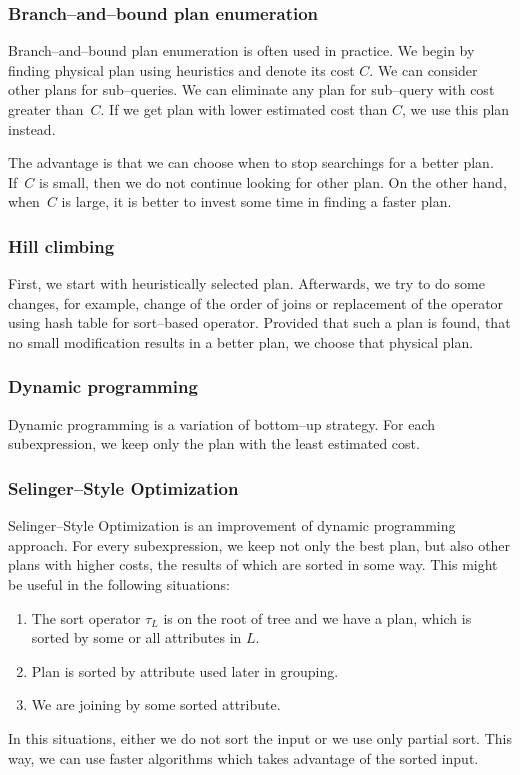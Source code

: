 \subsubsection{Branch--and--bound plan enumeration}
Branch--and--bound plan enumeration is often used in practice. We begin by finding physical plan using heuristics and denote its cost $C$. We can consider other plans for sub--queries. We can eliminate any plan for sub--query with cost greater than~$C$. If we get plan with lower estimated cost than $C$, we use this plan instead.

The advantage is that we can choose when to stop searchings for a better plan. If~$C$ is small, then we do not continue looking for other plan. On the other hand, when~$C$ is large, it is better to invest some time in finding a faster plan.
\subsubsection{Hill climbing}

First, we start with heuristically selected plan. Afterwards, we try to do some changes, for example, change of the order of joins or replacement of the operator using hash table for sort--based operator. Provided that such a plan is found, that no small modification results in a better plan, we choose that physical plan.

\subsubsection{Dynamic programming}
Dynamic programming is a variation of bottom--up strategy. For each subexpression, we keep only the plan with the least estimated cost.

\subsubsection{Selinger--Style Optimization}
Selinger--Style Optimization is an improvement of dynamic programming approach. For every subexpression, we keep not only the best plan, but also other plans with higher costs, the results of which are sorted in some way. This might be useful in the following situations:
\begin{enumerate}
\item The sort operator $\tau_L$ is on the root of tree and we have a plan, which is sorted by some or all attributes in $L$.
\item Plan is sorted by attribute used later in grouping.
\item We are joining by some sorted attribute.
\end{enumerate}
In this situations, either we do not sort the input or we use only partial sort. This way, we can use faster algorithms which takes advantage of the sorted input.


